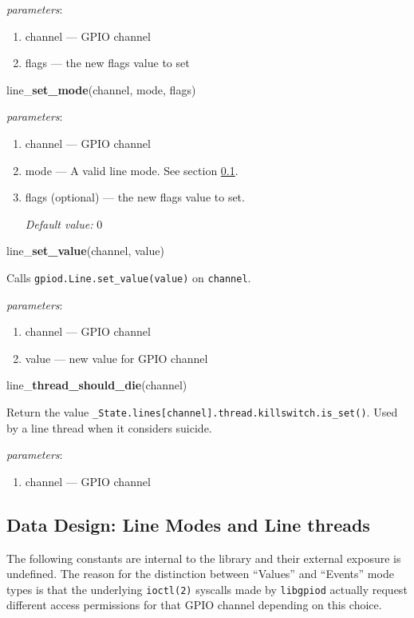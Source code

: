\documentclass[12pt]{article}
\begin{document}
\textit{parameters}:
\begin{enumerate}      
        \item channel --- GPIO channel
        \item flags --- the new flags value to set
\end{enumerate}

\noindent line\_\textbf{set\_mode}(channel, mode, flags)

\textit{parameters}:
\begin{enumerate}      
        \item channel --- GPIO channel
        \item mode --- A valid line mode. See section \ref{linemodes}.
        \item flags (optional) --- the new flags value to set.
        
        \textit{Default value:} $0$
\end{enumerate}

\noindent line\_\textbf{set\_value}(channel, value)

Calls \texttt{gpiod.Line.set\_value(value)} on \texttt{channel}.

\textit{parameters}:
\begin{enumerate}      
        \item channel --- GPIO channel
        \item value --- new value for GPIO channel
\end{enumerate}

\noindent line\_\textbf{thread\_should\_die}(channel)

Return the value \texttt{\_State.lines[channel].thread.killswitch.is\_set()}. Used by a line thread when it considers suicide.

\textit{parameters}:
\begin{enumerate}      
        \item channel --- GPIO channel
\end{enumerate}


\subsection{Data Design: Line Modes and Line threads} \label{linemodes}

The following constants are internal to the library and their external exposure is undefined. The reason for the distinction between ``Values'' and ``Events'' mode types is that the underlying \texttt{ioctl(2)} syscalls made by \texttt{libgpiod} actually request different access permissions for that GPIO channel depending on this choice.
\end{document}

